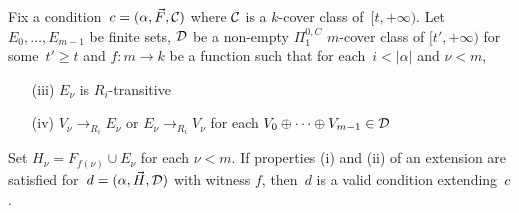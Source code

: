 \begin{lemma}\label{lem:em-comp-reduc-sufficient-cond-ext}
Fix a condition~$c = (\alpha, \vec{F}, \mathcal{C})$ where $\mathcal{C}$ is a $k$-cover class of~$[t, +\infty)$. 
Let $E_0, \dots, E_{m-1}$ be finite sets, $\mathcal{D}$ be a non-empty $\Pi^{0,C}_1$ $m$-cover class of $[t', +\infty)$
for some~$t' \geq t$ and $f : m \to k$ be a function such that for each~$i < |\alpha|$ and $\nu < m$,
\begin{itemize}
	\item[(iii)] $E_\nu$ is $R_i$-transitive
	\item[(iv)] $V_\nu \to_{R_i} E_\nu$ or $E_\nu \to_{R_i} V_\nu$ for each $V_0 \oplus \dots \oplus V_{m-1} \in \mathcal{D}$
\end{itemize}
Set $H_\nu = F_{f(\nu)} \cup E_\nu$ for each $\nu < m$.
If properties (i) and (ii) of an extension are satisfied for~$d = (\alpha, \vec{H}, \mathcal{D})$ with witness $f$,
then~$d$ is a valid condition extending~$c$.
\end{lemma}
